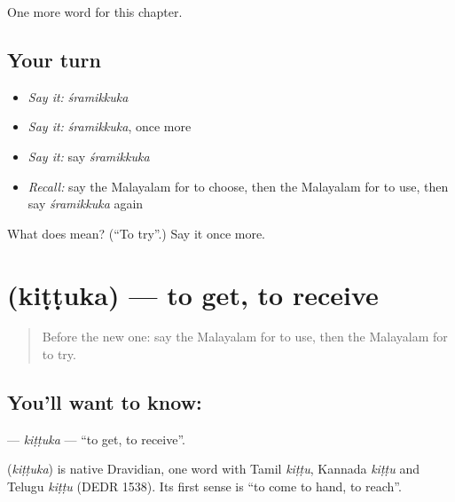 \begin{grammarlens}[title={What you've built}]
One more word for this chapter.
\end{grammarlens}

\subsection*{Your turn}
\begin{itemize}
\raggedright
  \item \emph{Say it:} \emph{śramikkuka}
  \item \emph{Say it:} \emph{śramikkuka}, once more
  \item \emph{Say it:} say \emph{śramikkuka}
  \item \emph{Recall:} say the Malayalam for to choose, then the Malayalam for to use, then say \emph{śramikkuka} again
\end{itemize}

\begin{tcolorbox}[breakable,colback=teal!4,colframe=teal!35!black,title={Before you move on}]
What does  mean? (\textquotedblleft{}To try\textquotedblright{}.) Say it once more.
\end{tcolorbox}
\section[\texorpdfstring{\ml{കിട്ടുക} (kiṭṭuka)}{കിട്ടുക (kiṭṭuka)}]{ (kiṭṭuka) — to get, to receive}

\label{lesson:ML-C183-kittuka}



\begin{quote}
Before the new one: say the Malayalam for to use, then the Malayalam for to try.
\end{quote}

\subsection*{You'll want to know: }
\textbf{} — \emph{kiṭṭuka} — \textquotedblleft{}to get, to receive\textquotedblright{}.

\begin{cousinweb}
\textbf{} (\emph{kiṭṭuka}) is native Dravidian, one word with Tamil \emph{kiṭṭu}, Kannada \emph{kiṭṭu} and Telugu \emph{kiṭṭu} (DEDR 1538). Its first sense is \textquotedblleft{}to come to hand, to reach\textquotedblright{}.
\end{cousinweb}

